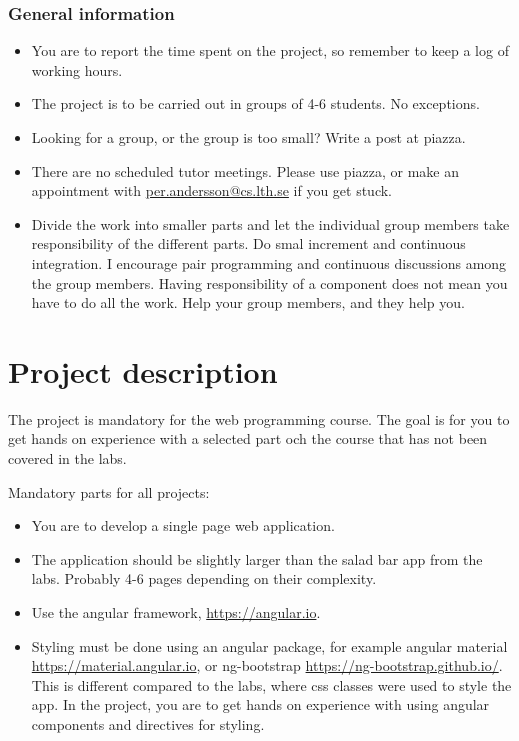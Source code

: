 \documentclass[fleqn, article, a4paper]{memoir}
\begin{document}
\maketitle
\thispagestyle{titlepage}
\vspace{-4cm}

\subsubsection*{General information}

\begin{itemize}\firmlist
\item You are to report the time spent on the project, so remember to keep a log of working hours.
\item The project is to be carried out in groups of 4-6 students. No exceptions.
\item Looking for a group, or the group is too small? Write a post at piazza.
\item There are no scheduled tutor meetings. Please use piazza, or make an appointment with \url{per.andersson@cs.lth.se} if you get stuck.
\item Divide the work into smaller parts and let the individual group members take responsibility of the different parts. Do smal increment and continuous integration. I encourage pair programming and continuous discussions among the group members. Having responsibility of a component does not mean you have to do all the work. Help your group members, and they help you.
\end{itemize}

\section*{Project description}
\n The project is mandatory for the web programming course. The goal is for you to get hands on experience with a selected part och the course that has not been covered in the labs.

\noindent Mandatory parts for all projects:
\begin{itemize}\firmlist
\item You are to develop a single page web application.
\item The application should be slightly larger than the salad bar app from the labs. Probably 4-6 pages depending on their complexity.
\item Use the angular framework, \url{https://angular.io}.
\item Styling must be done using an angular package, for example angular material \url{https://material.angular.io}, or ng-bootstrap \url{https://ng-bootstrap.github.io/}. This is different compared to the labs, where css classes were used to style the app. In the project, you are to get hands on experience with using angular components and directives for styling.
\end{itemize}
\end{document}
